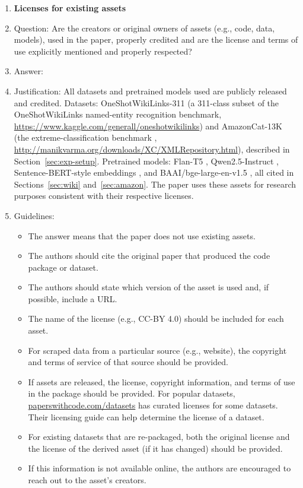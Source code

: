 \documentclass{article}
\theoremstyle{definition}
\theoremstyle{remark}
\theoremstyle{remark}
\begin{document}
\begin{enumerate}
\item {\bf Licenses for existing assets}
    \item[] Question: Are the creators or original owners of assets (e.g., code, data, models), used in the paper, properly credited and are the license and terms of use explicitly mentioned and properly respected?
    \item[] Answer: \answerYes{} %
    \item[] Justification: All datasets and pretrained models used are publicly released and credited. Datasets: OneShotWikiLinks-311 (a 311-class subset of the OneShotWikiLinks named-entity recognition benchmark, \url{https://www.kaggle.com/generall/oneshotwikilinks}) and AmazonCat-13K (the extreme-classification benchmark \cite{bhatia2016extreme}, \url{http://manikvarma.org/downloads/XC/XMLRepository.html}), described in Section~\ref{sec:exp-setup}. Pretrained models: Flan-T5 \cite{chung2024scaling}, Qwen2.5-Instruct \cite{hui2024qwen2}, Sentence-BERT-style embeddings \cite{reimers2019sentence}, and BAAI/bge-large-en-v1.5 \cite{xiao2024c}, all cited in Sections~\ref{sec:wiki} and~\ref{sec:amazon}. The paper uses these assets for research purposes consistent with their respective licenses.
    \item[] Guidelines:
    \begin{itemize}
        \item The answer \answerNA{} means that the paper does not use existing assets.
        \item The authors should cite the original paper that produced the code package or dataset.
        \item The authors should state which version of the asset is used and, if possible, include a URL.
        \item The name of the license (e.g., CC-BY 4.0) should be included for each asset.
        \item For scraped data from a particular source (e.g., website), the copyright and terms of service of that source should be provided.
        \item If assets are released, the license, copyright information, and terms of use in the package should be provided. For popular datasets, \url{paperswithcode.com/datasets} has curated licenses for some datasets. Their licensing guide can help determine the license of a dataset.
        \item For existing datasets that are re-packaged, both the original license and the license of the derived asset (if it has changed) should be provided.
        \item If this information is not available online, the authors are encouraged to reach out to the asset's creators.
    \end{itemize}


\end{enumerate}
\end{document}
